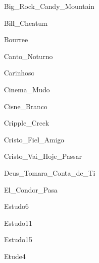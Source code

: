 \documentclass{article}
\begin{document}

{Big_Rock_Candy_Mountain}


{Bill_Cheatum}


{Bourree}


{Canto_Noturno}


{Carinhoso}


{Cinema_Mudo}


{Cisne_Branco}


{Cripple_Creek}


{Cristo_Fiel_Amigo}


{Cristo_Vai_Hoje_Passar}


{Deus_Tomara_Conta_de_Ti}


{El_Condor_Pasa}


{Estudo6}


{Estudo11}


{Estudo15}


{Etude4}
\end{document}
